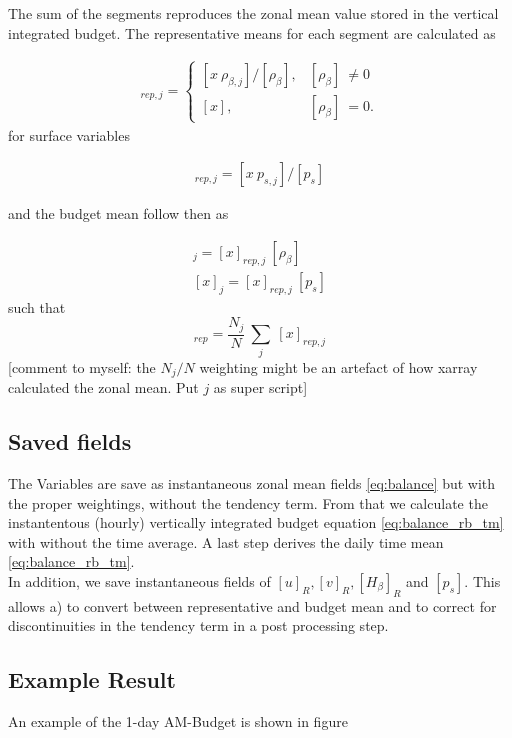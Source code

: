 \documentclass[11pt]{article}
\numberwithin{equation}{section}
\newcommand{\beq}{\begin{equation}}
\newcommand{\eeq}{\end{equation}}
\newcommand{\comment}[1]{{\color{red}[#1]}}
\begin{document}
The sum of the segments reproduces the zonal mean value stored in the vertical integrated budget.
The representative means for each segment are calculated as 

\begin{align}
[x]_{rep,j} = \begin{cases}  
       [ x ~\rho_{\beta,j} ] /  [  \rho_\beta ]  , &  [  \rho_\beta ]  ~ \ne 0  \\
       [ x ] , & [  \rho_\beta ]  ~= 0.
    \end{cases} 
\end{align}
for surface variables

\begin{align}
[x]_{rep,j} = 
       [ x ~p_{s,j} ] /  [  p_s ] 
\end{align}

and the budget mean follow then as

\begin{align}
[x]_{j}  = [x]_{rep,j}~   [  \rho_\beta ]  \\
[x]_{j}  = [x]_{rep,j}~   [  p_s ]  
\end{align}
such that 
\beq
[x]_{rep} =\frac{N_j}{N} ~\sum_j ~[x]_{rep,j} 
\eeq
\comment{comment to myself: the $N_j /N$ weighting might be an artefact of how xarray calculated the zonal mean. Put $j$ as super script}


\subsection{Saved fields}
The Variables are save as instantaneous zonal mean fields \eqref{eq:balance} but with the proper weightings, without the tendency term. From that we calculate the instantentous (hourly) vertically integrated budget equation \eqref{eq:balance_rb_tm} with without the time average. A last step derives the daily time mean \eqref{eq:balance_rb_tm}.\\
In addition, we save instantaneous fields of  $[u]_R, [v]_R,  [H_\beta]_R$ and $[p_s]$. This allows a) to convert between representative and budget mean and to correct for discontinuities in the tendency term in a post processing step. 



\subsection{Example Result}
An example of the 1-day AM-Budget is shown in figure %
\end{document}
